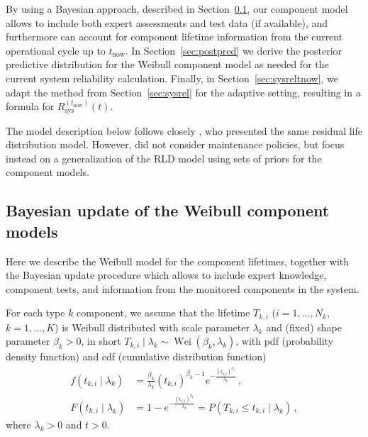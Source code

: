 \documentclass[authoryear]{elsarticle}
\newcommand{\wei}{\operatorname{Wei}} %
\def\tnow{t_\text{now}}
\newcommand{\Rsysnow}{R^{(t_\text{now})}_\text{sys}}
\begin{document}
By using a Bayesian approach, described in Section~\ref{sec:weibull},
our component model allows to include both expert assessments and test data (if available),
and furthermore can account for component lifetime information from the current operational cycle up to $\tnow$.
%
In Section~\ref{sec:postpred} we derive the posterior predictive distribution
for the Weibull component model as needed for the current system reliability calculation.
Finally, in Section~\ref{sec:sysreltnow}, we adapt the method from Section~\ref{sec:sysrel} for the adaptive setting,
resulting in a formula for $\Rsysnow(t)$.

The model description below follows closely \cite{2016:walter-coolen},
who presented the same residual life distribution model.
However, \cite{2016:walter-coolen} did not consider maintenance policies,
but focus instead on a generalization of the RLD model using sets of priors for the component models.


\subsection{Bayesian update of the Weibull component models}
\label{sec:weibull}

Here we describe the Weibull model for the component lifetimes,
together with the Bayesian update procedure which allows to include
expert knowledge, component tests, and information from the monitored components in the system.

For each type $k$ component, we assume that the lifetime $T_{k,i}$ ($i=1,\ldots,N_k$, $k = 1, \ldots, K$)
is Weibull distributed with scale parameter $\lambda_k$ and (fixed) shape parameter $\beta_k > 0$,
in short $T_{k,i} \mid \lambda_k \sim \wei(\beta_k,\lambda_k)$,
with pdf (probability density function) and cdf (cumulative distribution function)
\begin{align}
\label{eq:weibulldens}
f(t_{k,i} \mid \lambda_k) &= \frac{\beta_k}{\lambda_k} (t_{k,i})^{\beta_k-1} e^{-\frac{(t_{k,i})^{\beta_k}}{\lambda_k}}\,, \\
\label{eq:weibullcdf}
F(t_{k,i} \mid \lambda_k) &= 1 - e^{-\frac{(t_{k,i})^{\beta_k}}{\lambda_k}} = P(T_{k,i} \leq t_{k,i} \mid \lambda_k)\,,
\end{align}
where $\lambda_k > 0$ and $t > 0$.
\end{document}
